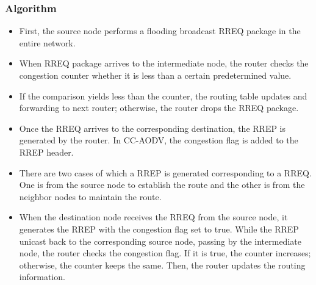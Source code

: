 \documentclass[12pt, a4paper]{article}
\begin{document}
\subsubsection{Algorithm}
\begin{itemize}
    \item First, the source node performs a
    flooding broadcast RREQ package in the entire network.
    \item When RREQ package arrives to the intermediate node, the router checks the congestion counter whether it is less than a certain predetermined value.
    \item If the comparison yields less than the counter, the routing table updates and forwarding to next router; otherwise, the router drops the RREQ package.
    \item Once the RREQ arrives to the corresponding destination, the RREP is generated by the router. In CC-AODV, the congestion flag is added to the RREP header.
    \item  There are two cases of which a RREP is generated corresponding to a RREQ. One is from the source node to establish the route and the other is from the neighbor nodes to maintain the route.
    \item When the destination node receives the RREQ from the source node, it generates the RREP with the congestion flag set to true. While the RREP unicast back to the corresponding source node, passing by the intermediate node, the router checks the congestion flag. If it is true, the counter increases; otherwise, the counter keeps the same. Then, the router updates the routing information.

\end{itemize}
\end{document}
